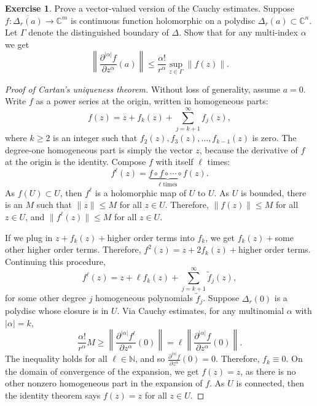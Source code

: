 \documentclass[12pt,openany]{book}
\newcommand{\sabs}[1]{\lvert {#1} \rvert}
\newcommand{\snorm}[1]{\lVert {#1} \rVert}
\newcommand{\abs}[1]{\left\lvert {#1} \right\rvert}
\newcommand{\norm}[1]{\left\lVert {#1} \right\rVert}
\newcommand{\C}{{\mathbb{C}}}
\newcommand{\N}{{\mathbb{N}}}
\theoremstyle{plain}
\theoremstyle{remark}
\theoremstyle{definition}
\newenvironment{exbox}{%
    \def\FrameCommand{\vrule width 1pt \relax\hspace{10pt}}%
    \MakeFramed {\advance \hsize -\width \FrameRestore}%
}{%
    \endMakeFramed
}
\theoremstyle{exercise}
\newtheorem{exercise}{Exercise}[section]
\theoremstyle{example}
\begin{document}
\begin{exbox}
\begin{exercise}
Prove a vector-valued version of the Cauchy estimates.  Suppose $f
\colon \overline{\Delta_r(a)} \to \C^m$ is continuous function holomorphic
on a polydisc $\Delta_r(a) \subset \C^n$.  Let $\Gamma$ denote the distinguished
boundary of $\Delta$.  Show that for any multi-index $\alpha$ we get
\begin{equation*}
\norm{\frac{\partial^{\abs{\alpha}}f}{\partial z^\alpha} (a)}
\leq
\frac{\alpha!}{r^\alpha} \sup_{z\in \Gamma} \norm{f(z)} .
\end{equation*}
\end{exercise}
\end{exbox}



\begin{proof}[Proof of Cartan's uniqueness theorem]
Without loss of generality, assume $a=0$.  Write $f$ 
as a power series at the origin, written in homogeneous parts:
\begin{equation*}
f(z) = z + f_k(z) + \sum_{j=k+1}^\infty f_j(z) ,
\end{equation*}
where $k \geq 2$ is an integer such that $f_2(z),f_3(z),\ldots,f_{k-1}(z)$ is zero.
The degree-one homogeneous part is simply the vector $z$,
because
the derivative of $f$ at the origin is the identity.
Compose $f$ with itself $\ell$ times:
\begin{equation*}
f^\ell(z) = \underbrace{f \circ f \circ \cdots \circ f}_{\ell\text{ times}}
(z) .
\end{equation*}
As $f(U) \subset U$, then $f^\ell$ is a holomorphic map
of $U$ to $U$.  As $U$ is bounded, there is an $M$ such that $\snorm{z} \leq
M$ for all $z \in U$.  Therefore, $\snorm{f(z)} \leq M$ for all $z \in U$, and
$\snorm{f^\ell(z)} \leq M$ for all $z \in U$.

If we plug in $z + f_k(z) + {}$higher order terms
into $f_k$, we get $f_k(z) + {}$some other higher order terms.
Therefore, $f^2(z) = z + 2 f_k(z) + {}$higher order terms.
Continuing this procedure,
\begin{equation*}
f^\ell(z) = z + \ell f_k(z) + \sum_{j=k+1}^\infty \tilde{f}_j(z) ,
\end{equation*}
for some other degree $j$ homogeneous polynomials $\tilde{f}_j$.  Suppose $\Delta_r(0)$ is a polydisc whose
closure is in $U$.
Via Cauchy estimates,
for any multinomial $\alpha$ with $\sabs{\alpha}=k$,
\begin{equation*}
\frac{\alpha!}{r^\alpha} M
\geq
\norm{\frac{\partial^{\sabs{\alpha}} f^\ell}{\partial z^\alpha}(0)}
=
\ell
\norm{\frac{\partial^{\sabs{\alpha}} f}{\partial z^\alpha}(0)} .
\end{equation*}
The inequality holds for all $\ell \in \N$, and so
$\frac{\partial^{\sabs{\alpha}} f}{\partial z^\alpha}(0) = 0$.  Therefore,
$f_k \equiv 0$.  On the domain of convergence of the expansion,
we get $f(z) = z$, as there is no other
nonzero homogeneous part in the expansion of $f$.  As $U$ is connected,
then the identity theorem says $f(z) = z$ for all $z \in U$.
\end{proof}
\end{document}
